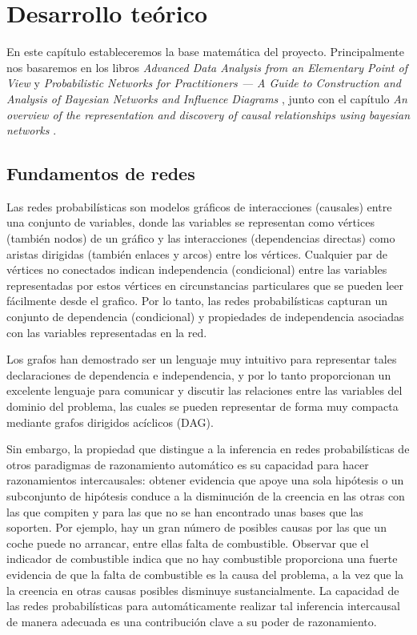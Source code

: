 \chapter{Desarrollo teórico}
En este capítulo estableceremos la base matemática del proyecto. Principalmente nos basaremos en 
los libros \textit{Advanced Data Analysis
from an Elementary Point of View} \cite{ada} y \textit{Probabilistic Networks for Practitioners — A
Guide to Construction and Analysis of Bayesian
Networks and Influence Diagrams} \cite{pgm}, junto con el capítulo \textit{An overview of the representation and 
discovery of causal relationships using bayesian networks} \cite{cooper}.

\section{Fundamentos de redes}
Las redes probabilísticas son modelos gráficos de interacciones (causales) entre una
conjunto de variables, donde las variables se representan como vértices (también nodos)
de un gráfico y las interacciones (dependencias directas) como aristas dirigidas (también
enlaces y arcos) entre los vértices. Cualquier par de vértices no conectados indican 
independencia (condicional) entre las variables representadas
por estos vértices en circunstancias particulares que se pueden leer fácilmente desde el
grafico. Por lo tanto, las redes probabilísticas capturan un conjunto de dependencia (condicional)
y propiedades de independencia asociadas con las variables representadas en la red.

Los grafos han demostrado ser un lenguaje muy intuitivo para representar
tales declaraciones de dependencia e independencia, y por lo tanto proporcionan un excelente
lenguaje para comunicar y discutir las relaciones entre las 
variables del dominio del problema, las cuales se pueden representar de forma muy compacta 
mediante grafos dirigidos acíclicos (DAG).

Sin embargo, la propiedad que distingue a la inferencia en redes probabilísticas
de otros paradigmas de razonamiento automático es su capacidad para hacer razonamientos intercausales: 
obtener evidencia que apoye una sola hipótesis o un subconjunto de
hipótesis conduce a la disminución de la creencia en las otras con las que compiten y para las que no se 
han encontrado unas bases que las soporten. Por ejemplo, hay un gran número de posibles causas por las que un coche
puede no arrancar, entre ellas falta de combustible. Observar que el indicador de combustible indica que no hay combustible
proporciona una fuerte evidencia de que la falta de combustible es la causa del problema, a la vez que la
la creencia en otras causas posibles disminuye sustancialmente. La capacidad de las redes probabilísticas para automáticamente
realizar tal inferencia intercausal de manera adecuada es una contribución clave a su poder de razonamiento.

